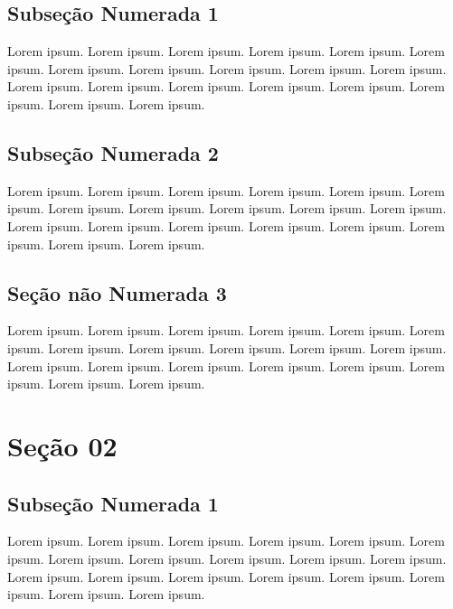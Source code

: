 \documentclass[
]{book}
\begin{document}
\hypertarget{subseuxe7uxe3o-numerada-1}{%
\subsection{Subseção Numerada 1}\label{subseuxe7uxe3o-numerada-1}}

Lorem ipsum. Lorem ipsum. Lorem ipsum. Lorem ipsum. Lorem ipsum. Lorem ipsum. Lorem ipsum. Lorem ipsum. Lorem ipsum. Lorem ipsum. Lorem ipsum. Lorem ipsum. Lorem ipsum. Lorem ipsum. Lorem ipsum. Lorem ipsum. Lorem ipsum. Lorem ipsum. Lorem ipsum.

\hypertarget{subseuxe7uxe3o-numerada-2}{%
\subsection{Subseção Numerada 2}\label{subseuxe7uxe3o-numerada-2}}

Lorem ipsum. Lorem ipsum. Lorem ipsum. Lorem ipsum. Lorem ipsum. Lorem ipsum. Lorem ipsum. Lorem ipsum. Lorem ipsum. Lorem ipsum. Lorem ipsum. Lorem ipsum. Lorem ipsum. Lorem ipsum. Lorem ipsum. Lorem ipsum. Lorem ipsum. Lorem ipsum. Lorem ipsum.

\hypertarget{seuxe7uxe3o-nuxe3o-numerada-3}{%
\subsection*{Seção não Numerada 3}\label{seuxe7uxe3o-nuxe3o-numerada-3}}

Lorem ipsum. Lorem ipsum. Lorem ipsum. Lorem ipsum. Lorem ipsum. Lorem ipsum. Lorem ipsum. Lorem ipsum. Lorem ipsum. Lorem ipsum. Lorem ipsum. Lorem ipsum. Lorem ipsum. Lorem ipsum. Lorem ipsum. Lorem ipsum. Lorem ipsum. Lorem ipsum. Lorem ipsum.

\hypertarget{seuxe7uxe3o-02}{%
\section{Seção 02}\label{seuxe7uxe3o-02}}

\hypertarget{subseuxe7uxe3o-numerada-1-1}{%
\subsection{Subseção Numerada 1}\label{subseuxe7uxe3o-numerada-1-1}}

Lorem ipsum. Lorem ipsum. Lorem ipsum. Lorem ipsum. Lorem ipsum. Lorem ipsum. Lorem ipsum. Lorem ipsum. Lorem ipsum. Lorem ipsum. Lorem ipsum. Lorem ipsum. Lorem ipsum. Lorem ipsum. Lorem ipsum. Lorem ipsum. Lorem ipsum. Lorem ipsum. Lorem ipsum.
\end{document}
